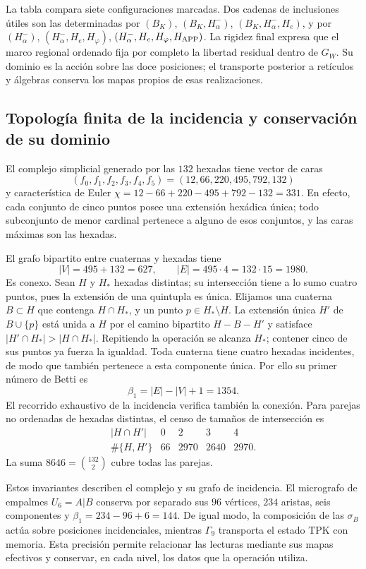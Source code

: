 La tabla compara siete configuraciones marcadas. Dos cadenas de
inclusiones útiles son las determinadas por
\((B_K)\), \((B_K,H^-_\alpha)\), \((B_K,H^-_\alpha,H_e)\),
y por
\((H^-_\alpha)\), \((H^-_\alpha,H_e,H_\varphi)\),
\((H^-_\alpha,H_e,H_\varphi,H_{\rm APP})\).
La rigidez final expresa que el marco regional ordenado fija por
completo la libertad residual dentro de \(G_W\). Su dominio es la
acción sobre las doce posiciones; el transporte posterior a
retículos y álgebras conserva los mapas propios de esas realizaciones.

\subsection{Topología finita de la incidencia y conservación de su dominio}
\label{star27:topologia}

El complejo simplicial generado por las \(132\) hexadas tiene vector
de caras
\[
(f_0,f_1,f_2,f_3,f_4,f_5)=(12,66,220,495,792,132)
\]
y característica de Euler
\(\chi=12-66+220-495+792-132=331\).
En efecto, cada conjunto de cinco puntos posee una extensión
hexádica única; todo subconjunto de menor cardinal pertenece a
alguno de esos conjuntos, y las caras máximas son las hexadas.

El grafo bipartito entre cuaternas y hexadas tiene
\[
|V|=495+132=627,\qquad |E|=495\cdot4=132\cdot15=1980.
\]
Es conexo. Sean \(H\) y \(H_*\) hexadas distintas; su
intersección tiene a lo sumo cuatro puntos, pues la extensión
de una quintupla es única. Elijamos una cuaterna \(B\subset H\)
que contenga \(H\cap H_*\), y un punto \(p\in H_*\setminus H\).
La extensión única \(H'\) de \(B\cup\{p\}\) está unida a
\(H\) por el camino bipartito \(H-B-H'\) y satisface
\(|H'\cap H_*|>|H\cap H_*|\). Repitiendo la operación se
alcanza \(H_*\); contener cinco de sus puntos ya fuerza la
igualdad. Toda cuaterna tiene cuatro hexadas incidentes, de
modo que también pertenece a esta componente única.
Por ello su primer número de Betti es
\[
\beta_1=|E|-|V|+1=1354.
\]
El recorrido exhaustivo de la incidencia verifica también la
conexión. Para parejas no ordenadas de hexadas distintas, el censo
de tamaños de intersección es
\[
\begin{array}{c|rrrr}
|H\cap H'|&0&2&3&4\\ \hline
\#\{H,H'\}&66&2970&2640&2970 .
\end{array}
\]
La suma \(8646=\binom{132}{2}\) cubre todas las parejas.

Estos invariantes describen el complejo y su grafo de incidencia.
El micrografo de empalmes \(U_6=A|B\) conserva por separado sus
\(96\) vértices, \(234\) aristas, seis componentes y
\(\beta_1=234-96+6=144\). De igual modo, la composición de las
\(\sigma_B\) actúa sobre posiciones incidenciales, mientras
\(\Gamma_9\) transporta el estado TPK con memoria. Esta precisión
permite relacionar las lecturas mediante sus mapas efectivos y
conservar, en cada nivel, los datos que la operación utiliza.
